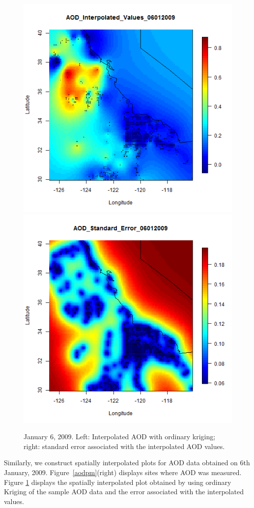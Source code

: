 \documentclass[10pt]{article}
\begin{document}
\begin{figure}[H]
\centering
  \includegraphics[width=.45\textwidth]{Interpolated_AOD2009_06.png}
  \includegraphics[width=.45\textwidth]{StandardError_AOD2009_06.png}
\caption{January 6, 2009. Left: Interpolated AOD with ordinary kriging; right: 
standard error associated with the interpolated AOD values.}
\label{exampleaod}
\end{figure}


Similarly, we construct spatially interpolated plots for AOD data obtained on
6th January, 2009. Figure~\ref{aodpm}(right) displays sites where AOD was measured.
Figure \ref{exampleaod} displays the spatially interpolated plot obtained by
using ordinary Kriging of the sample AOD data and the error associated with the
interpolated values.
\end{document}

